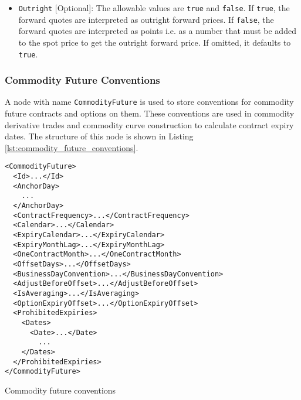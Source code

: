\begin{itemize}
\item \lstinline!Outright! [Optional]: The allowable values are \lstinline!true! and \lstinline!false!. If \lstinline!true!, the forward quotes are interpreted as outright forward prices. If \lstinline!false!, the forward quotes are interpreted as points i.e. as a number that must be added to the spot price to get the outright forward price. If omitted, it defaults to \lstinline!true!.
\end{itemize}

\subsubsection{Commodity Future Conventions}
A node with name \lstinline!CommodityFuture! is used to store conventions for commodity future contracts and options on them. These conventions are used in commodity derivative trades and commodity curve construction to calculate contract expiry dates. The structure of this node is shown in Listing \ref{lst:commodity_future_conventions}.

\begin{listing}[h!]
\begin{verbatim}
<CommodityFuture>
  <Id>...</Id>
  <AnchorDay>
    ...
  </AnchorDay>
  <ContractFrequency>...</ContractFrequency>
  <Calendar>...</Calendar>
  <ExpiryCalendar>...</ExpiryCalendar>
  <ExpiryMonthLag>...</ExpiryMonthLag>
  <OneContractMonth>...</OneContractMonth>
  <OffsetDays>...</OffsetDays>
  <BusinessDayConvention>...</BusinessDayConvention>
  <AdjustBeforeOffset>...</AdjustBeforeOffset>
  <IsAveraging>...</IsAveraging>
  <OptionExpiryOffset>...</OptionExpiryOffset>
  <ProhibitedExpiries>
    <Dates>
      <Date>...</Date>
        ...
    </Dates>
  </ProhibitedExpiries>
</CommodityFuture>
\end{verbatim}
\caption{Commodity future conventions}
\label{lst:commodity_future_conventions}
\end{listing}

